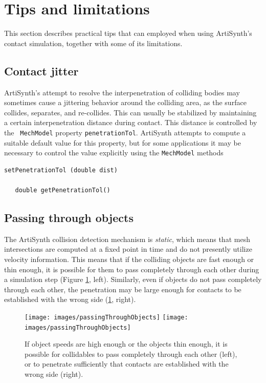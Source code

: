 \section{Tips and limitations}
\label{ContactLimitations:sec}

This section describes practical tips that can employed when using
ArtiSynth's contact simulation, together with some of its limitations.

\subsection{Contact jitter}

ArtiSynth's attempt to resolve the interpenetration of colliding
bodies may sometimes cause a jittering behavior around the colliding
area, as the surface collides, separates, and re-collides.  This can
usually be stabilized by maintaining a certain interpenetration
distance during contact. This distance is controlled by the {\tt
MechModel} property {\tt penetrationTol}.  ArtiSynth attempts to
compute a suitable default value for this property, but for some
applications it may be necessary to control the value explicitly using
the {\tt MechModel} methods
%
\begin{lstlisting}[]
   setPenetrationTol (double dist)

   double getPenetrationTol()
\end{lstlisting}
%
\subsection{Passing through objects}
\label{PassingThroughObjects:sec}

The ArtiSynth collision detection mechanism is {\it static}, which
means that mesh intersections are computed at a fixed point in time
and do not presently utilize velocity information. This means that if
the colliding objects are fast enough or thin enough, it is possible
for them to pass completely through each other during a simulation
step (Figure
\ref{passingThroughObjects:fig}, left). Similarly, even if objects
do not pass completely through each other, the penetration may be
large enough for contacts to be established with the wrong side
(\ref{passingThroughObjects:fig}, right).

\begin{figure}[ht]
\begin{center}
\iflatexml
 \texttt{[image: images/passingThroughObjects]}
\else
 \texttt{[image: images/passingThroughObjects]}
\fi
\end{center}
\caption{If object speeds are high enough or the objects thin enough, it
is possible for collidables to pass completely through each other
(left), or to penetrate sufficiently that contacts are established
with the wrong side (right).}
\label{passingThroughObjects:fig}
\end{figure}

